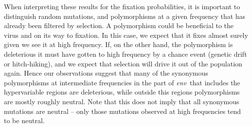 \documentclass[rmp, twocolumn]{revtex4}
\newcommand{\env}{\textit{env}}
\begin{document}
When interpreting these results for the fixation probabilities, it is important
to distinguish random mutations, and polymorphisms at a given frequency that has
already been filtered by selection.
A polymorphism could be beneficial to the virus and on its way to fixation. In
this case, we expect that it fixes almost surely given we see it at high
frequency. If, on the other hand, the polymorphism is deleterious it must have
gotten to high frequency by a chance event (genetic drift or hitch-hiking), and
we expect that selection will drive it out of the population again. Hence our
observations suggest that many of the synonymous polymorphisms at intermediate
frequencies in the part of \env~that includes the hypervariable regions are
deleterious, while outside this regions polymorphisms are mostly roughly
neutral. Note that this does not imply that all synonymous mutations are neutral
-- only those mutations observed at high frequencies tend to be neutral.
\end{document}
